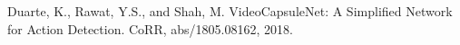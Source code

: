 \documentclass[a4paper,12pt]{report}
\begin{document}
\begin{thebibliography}{2}
Duarte, K., Rawat, Y.S., and Shah, M. VideoCapsuleNet: A Simplified Network for Action Detection. CoRR, abs/1805.08162, 2018.








\end{thebibliography}
\end{document}
